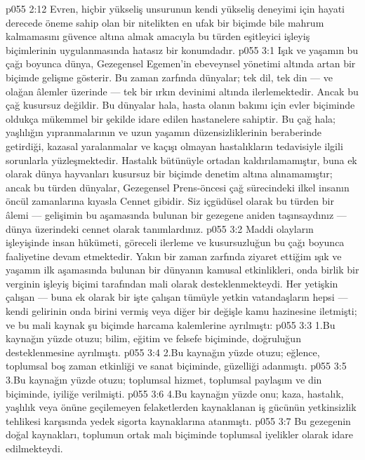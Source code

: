 \vs p055 2:12 Evren, hiçbir yükseliş unsurunun kendi yükseliş deneyimi için hayati derecede öneme sahip olan bir nitelikten en ufak bir biçimde bile mahrum kalmamasını güvence altına almak amacıyla bu türden eşitleyici işleyiş biçimlerinin uygulanmasında hatasız bir konumdadır.
\vs p055 3:1 Işık ve yaşamın bu çağı boyunca dünya, Gezegensel Egemen’in ebeveynsel yönetimi altında artan bir biçimde gelişme gösterir. Bu zaman zarfında dünyalar; tek dil, tek din --- ve olağan âlemler üzerinde --- tek bir ırkın devinimi altında ilerlemektedir. Ancak bu çağ kusursuz değildir. Bu dünyalar hala, hasta olanın bakımı için evler biçiminde oldukça mükemmel bir şekilde idare edilen hastanelere sahiptir. Bu çağ hala; yaşlılığın yıpranmalarının ve uzun yaşamın düzensizliklerinin beraberinde getirdiği, kazasal yaralanmalar ve kaçışı olmayan hastalıkların tedavisiyle ilgili sorunlarla yüzleşmektedir. Hastalık bütünüyle ortadan kaldırılamamıştır, buna ek olarak dünya hayvanları kusursuz bir biçimde denetim altına alınamamıştır; ancak bu türden dünyalar, Gezegensel Prens\hyp{}öncesi çağ sürecindeki ilkel insanın öncül zamanlarına kıyasla Cennet gibidir. Siz içgüdüsel olarak bu türden bir âlemi --- gelişimin bu aşamasında bulunan bir gezegene aniden taşınsaydınız --- dünya üzerindeki cennet olarak tanımlardınız.
\vs p055 3:2 Maddi olayların işleyişinde insan hükümeti, göreceli ilerleme ve kusursuzluğun bu çağı boyunca faaliyetine devam etmektedir. Yakın bir zaman zarfında ziyaret ettiğim ışık ve yaşamın ilk aşamasında bulunan bir dünyanın kamusal etkinlikleri, onda birlik bir verginin işleyiş biçimi tarafından mali olarak desteklenmekteydi. Her yetişkin çalışan --- buna ek olarak bir işte çalışan tümüyle yetkin vatandaşların hepsi --- kendi gelirinin onda birini vermiş veya diğer bir değişle kamu hazinesine iletmişti; ve bu mali kaynak şu biçimde harcama kalemlerine ayrılmıştı:
\vs p055 3:3 1.\bibnobreakspace Bu kaynağın yüzde otuzu; bilim, eğitim ve felsefe biçiminde, doğruluğun desteklenmesine ayrılmıştı.
\vs p055 3:4 2.\bibnobreakspace Bu kaynağın yüzde otuzu; eğlence, toplumsal boş zaman etkinliği ve sanat biçiminde, güzelliği adanmıştı.
\vs p055 3:5 3.\bibnobreakspace Bu kaynağın yüzde otuzu; toplumsal hizmet, toplumsal paylaşım ve din biçiminde, iyiliğe verilmişti.
\vs p055 3:6 4.\bibnobreakspace Bu kaynağın yüzde onu; kaza, hastalık, yaşlılık veya önüne geçilemeyen felaketlerden kaynaklanan iş gücünün yetkinsizlik tehlikesi karşısında yedek sigorta kaynaklarına atanmıştı.
\vs p055 3:7 Bu gezegenin doğal kaynakları, toplumun ortak malı biçiminde toplumsal iyelikler olarak idare edilmekteydi.
